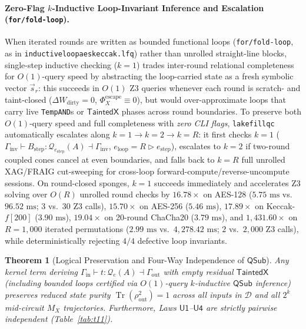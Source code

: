 \documentclass[acmsmall,screen,anonymous]{acmart}
\DeclareRobustCommand{\_}{\ifmmode\text{\char95}\else\char95\penalty0\relax\fi}
\theoremstyle{plain}
\newtheorem{theorem}{Theorem}[section]
\newcommand{\QSub}{\ensuremath{\mathsf{QSub}}}
\newcommand{\CapTaintedX}{\ensuremath{\mathsf{TaintedX}}}
\begin{document}
\paragraph{Zero-Flag $k$-Inductive Loop-Invariant Inference and Escalation (\texttt{for/fold-loop}).}
When iterated rounds are written as bounded functional loops (\texttt{for/fold-loop}, as in \texttt{inductive\_loop\_aes\_keccak.lfq}) rather than unrolled straight-line blocks, single-step inductive checking ($k=1$) trades inter-round relational completeness for $O(1)$-query speed by abstracting the loop-carried state as a fresh symbolic vector $\vec{s}_r$: this succeeds in $O(1)$ Z3 queries whenever each round is scratch- and taint-closed ($\Delta W_{\mathrm{dirty}} = 0$, $\Phi_X^{\mathrm{escape}} \equiv 0$), but would over-approximate loops that carry live \texttt{TempAND}s or $\CapTaintedX$ phases across round boundaries. To preserve both $O(1)$-query speed and full completeness with \emph{zero CLI flags}, \texttt{lakefillqc} automatically escalates along $k=1 \to k=2 \to k=R$: it first checks $k=1$ ($\Gamma_{\mathrm{inv}} \vdash B_{\mathrm{step}} : \mathcal{Q}_{e_{\mathrm{step}}}(A) \dashv \Gamma_{\mathrm{inv}}$, $e_{\mathrm{loop}} = R \triangleright e_{\mathrm{step}}$), escalates to $k=2$ if two-round coupled cones cancel at even boundaries, and falls back to $k=R$ full unrolled XAG/FRAIG cut-sweeping for cross-loop forward-compute/reverse-uncompute sessions. On round-closed sponges, $k=1$ succeeds immediately and accelerates Z3 solving over $O(R)$ unrolled round checks by $16.78\times$ on AES-128 ($5.75\text{ ms}$ vs.\ $96.52\text{ ms}$; $3$ vs.\ $30$ Z3 calls), $15.70\times$ on AES-256 ($5.46\text{ ms}$), $17.89\times$ on Keccak-$f[200]$ ($3.90\text{ ms}$), $19.04\times$ on 20-round ChaCha20 ($3.79\text{ ms}$), and $1{,}431.60\times$ on $R=1{,}000$ iterated permutations ($2.99\text{ ms}$ vs.\ $4{,}278.42\text{ ms}$; $2$ vs.\ $2{,}000$ Z3 calls), while deterministically rejecting $4/4$ defective loop invariants.

\begin{theorem}[Logical Preservation and Four-Way Independence of $\QSub$]
\label{thm:t2}
Any kernel term deriving $\Gamma_{\mathrm{in}} \vdash t : \mathcal{Q}_{e}(A) \dashv \Gamma_{\mathrm{out}}$ with empty residual $\CapTaintedX$ (including bounded loops certified via $O(1)$-query $k$-inductive $\QSub$ inference) preserves reduced state purity $\operatorname{Tr}(\rho_{\mathrm{out}}^2) = 1$ across all inputs in $\mathcal{D}$ and all $2^k$ mid-circuit $M_X$ trajectories. Furthermore, Laws $\mathsf{U1}$--$\mathsf{U4}$ are strictly pairwise independent (Table~\ref{tab:t11}).
\end{theorem}
\end{document}
